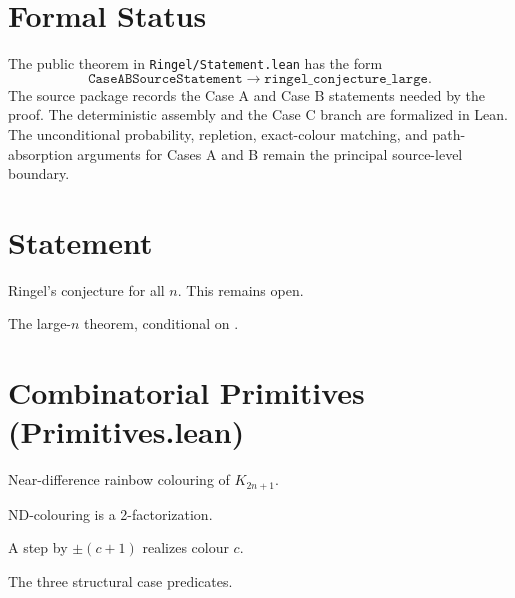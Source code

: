 \chapter{Formal Status}

The public theorem in \texttt{Ringel/Statement.lean} has the form
\[
\texttt{CaseABSourceStatement} \to \texttt{ringel\_conjecture\_large}.
\]
The source package records the Case A and Case B statements needed by the proof.
The deterministic assembly and the Case C branch are formalized in Lean. The unconditional
probability, repletion, exact-colour matching, and path-absorption arguments for Cases A and B
remain the principal source-level boundary.

\chapter{Statement}

\begin{definition}\label{def:ringel_conjecture}
Ringel's conjecture for all $n$. This remains open.
\end{definition}

\begin{definition}\label{def:ringel_conjecture_large}
The large-$n$ theorem, conditional on .
\end{definition}

\chapter{Combinatorial Primitives (Primitives.lean)}

\begin{definition}\label{def:ndColouring}
\leanok
Near-difference rainbow colouring of $K_{2n+1}$.
\end{definition}

\begin{theorem}\label{thm:ndColouring_isTwoFactorization}
\leanok
ND-colouring is a 2-factorization.
\end{theorem}

\begin{lemma}\label{lem:ndColouring_step}
\leanok
A step by $\pm(c+1)$ realizes colour $c$.
\end{lemma}

\begin{definition}\label{def:case_predicates}
\leanok
The three structural case predicates.
\end{definition}

